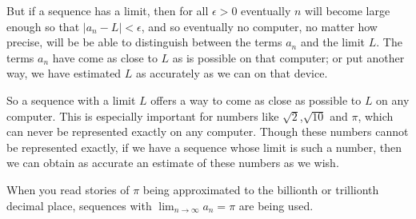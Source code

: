 But if a sequence has a limit, then for all $\epsilon > 0$ eventually $n$ will become large enough so that $|a_n -L|<\epsilon$, and so eventually no computer, no matter how precise, will be be able to distinguish between the terms $a_n$ and the limit $L$. The terms $a_n$ have come as close to $L$ as is possible on that computer; or put another way, we have estimated $L$ as accurately as we can on that device.

So a sequence with a limit $L$ offers a way to come as close as possible to $L$ on any computer. This is especially important for numbers like $\sqrt{2}$,$\sqrt{10}$ and $\pi$, which can never be represented exactly on any computer. Though these numbers cannot be represented exactly, if we have a sequence whose limit is such a number, then we can obtain as accurate an estimate of these numbers as we wish.

When you read stories of $\pi$ being approximated to the billionth or trillionth decimal place, sequences with $\lim_{n \to \infty} a_n = \pi$ are being used.


